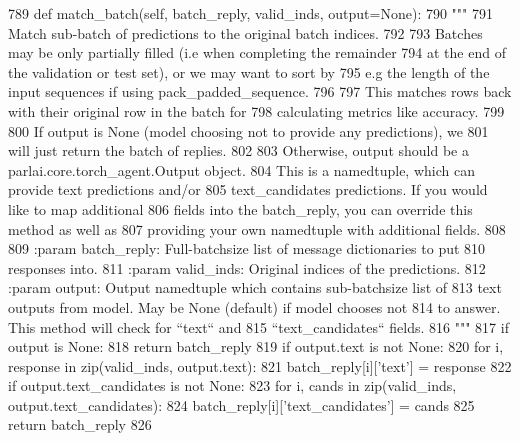 \begin{DoxyCode}
789     \textcolor{keyword}{def }match\_batch(self, batch\_reply, valid\_inds, output=None):
790         \textcolor{stringliteral}{"""}
791 \textcolor{stringliteral}{        Match sub-batch of predictions to the original batch indices.}
792 \textcolor{stringliteral}{}
793 \textcolor{stringliteral}{        Batches may be only partially filled (i.e when completing the remainder}
794 \textcolor{stringliteral}{        at the end of the validation or test set), or we may want to sort by}
795 \textcolor{stringliteral}{        e.g the length of the input sequences if using pack\_padded\_sequence.}
796 \textcolor{stringliteral}{}
797 \textcolor{stringliteral}{        This matches rows back with their original row in the batch for}
798 \textcolor{stringliteral}{        calculating metrics like accuracy.}
799 \textcolor{stringliteral}{}
800 \textcolor{stringliteral}{        If output is None (model choosing not to provide any predictions), we}
801 \textcolor{stringliteral}{        will just return the batch of replies.}
802 \textcolor{stringliteral}{}
803 \textcolor{stringliteral}{        Otherwise, output should be a parlai.core.torch\_agent.Output object.}
804 \textcolor{stringliteral}{        This is a namedtuple, which can provide text predictions and/or}
805 \textcolor{stringliteral}{        text\_candidates predictions. If you would like to map additional}
806 \textcolor{stringliteral}{        fields into the batch\_reply, you can override this method as well as}
807 \textcolor{stringliteral}{        providing your own namedtuple with additional fields.}
808 \textcolor{stringliteral}{}
809 \textcolor{stringliteral}{        :param batch\_reply: Full-batchsize list of message dictionaries to put}
810 \textcolor{stringliteral}{            responses into.}
811 \textcolor{stringliteral}{        :param valid\_inds: Original indices of the predictions.}
812 \textcolor{stringliteral}{        :param output: Output namedtuple which contains sub-batchsize list of}
813 \textcolor{stringliteral}{            text outputs from model. May be None (default) if model chooses not}
814 \textcolor{stringliteral}{            to answer. This method will check for ``text`` and}
815 \textcolor{stringliteral}{            ``text\_candidates`` fields.}
816 \textcolor{stringliteral}{        """}
817         \textcolor{keywordflow}{if} output \textcolor{keywordflow}{is} \textcolor{keywordtype}{None}:
818             \textcolor{keywordflow}{return} batch\_reply
819         \textcolor{keywordflow}{if} output.text \textcolor{keywordflow}{is} \textcolor{keywordflow}{not} \textcolor{keywordtype}{None}:
820             \textcolor{keywordflow}{for} i, response \textcolor{keywordflow}{in} zip(valid\_inds, output.text):
821                 batch\_reply[i][\textcolor{stringliteral}{'text'}] = response
822         \textcolor{keywordflow}{if} output.text\_candidates \textcolor{keywordflow}{is} \textcolor{keywordflow}{not} \textcolor{keywordtype}{None}:
823             \textcolor{keywordflow}{for} i, cands \textcolor{keywordflow}{in} zip(valid\_inds, output.text\_candidates):
824                 batch\_reply[i][\textcolor{stringliteral}{'text\_candidates'}] = cands
825         \textcolor{keywordflow}{return} batch\_reply
826 
\end{DoxyCode}
